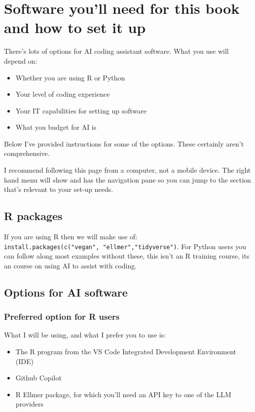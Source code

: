 \documentclass[
  letterpaper,
  DIV=11,
  numbers=noendperiod]{scrreprt}
\providecommand{\tightlist}{%
  \setlength{\itemsep}{0pt}\setlength{\parskip}{0pt}}\usepackage{longtable,booktabs,array}
\begin{document}

\chapter{Software you'll need for this book and how to set it
up}\label{sec-setup}

There's lots of options for AI coding assistant software. What you use
will depend on:

\begin{itemize}
\tightlist
\item
  Whether you are using R or Python
\item
  Your level of coding experience
\item
  Your IT capabilities for setting up software
\item
  What you budget for AI is
\end{itemize}

Below I've provided instructions for some of the options. These
certainly aren't comprehensive.

I recommend following this page from a computer, not a mobile device.
The right hand menu will show and has the navigation pane so you can
jump to the section that's relevant to your set-up needs.

\section{R packages}\label{r-packages}

If you are using R then we will make use of:
\texttt{install.packages(c("vegan",\ "ellmer","tidyverse")}. For Python
users you can follow along most examples without these, this isn't an R
training course, its an course on using AI to assist with coding.

\section{Options for AI software}\label{options-for-ai-software}

\subsection{Preferred option for R
users}\label{preferred-option-for-r-users}

What I will be using, and what I prefer you to use is:

\begin{itemize}
\tightlist
\item
  The R program from the VS Code Integrated Development Environment
  (IDE)
\item
  Github Copilot
\item
  R Ellmer package, for which you'll need an API key to one of the LLM
  providers
\end{itemize}
\end{document}
